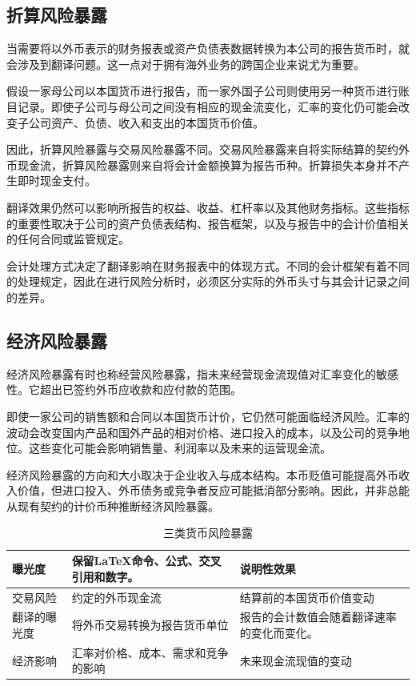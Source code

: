 \subsection{折算风险暴露}

当需要将以外币表示的财务报表或资产负债表数据转换为本公司的报告货币时，就会涉及到翻译问题。这一点对于拥有海外业务的跨国企业来说尤为重要。

假设一家母公司以本国货币进行报告，而一家外国子公司则使用另一种货币进行账目记录。即使子公司与母公司之间没有相应的现金流变化，汇率的变化仍可能会改变子公司资产、负债、收入和支出的本国货币价值。

因此，折算风险暴露与交易风险暴露不同。交易风险暴露来自将实际结算的契约外币现金流，折算风险暴露则来自将会计金额换算为报告币种。折算损失本身并不产生即时现金支付。

翻译效果仍然可以影响所报告的权益、收益、杠杆率以及其他财务指标。这些指标的重要性取决于公司的资产负债表结构、报告框架，以及与报告中的会计价值相关的任何合同或监管规定。

会计处理方式决定了翻译影响在财务报表中的体现方式。不同的会计框架有着不同的处理规定，因此在进行风险分析时，必须区分实际的外币头寸与其会计记录之间的差异。

\subsection{经济风险暴露}

经济风险暴露有时也称经营风险暴露，指未来经营现金流现值对汇率变化的敏感性。它超出已签约外币应收款和应付款的范围。

即使一家公司的销售额和合同以本国货币计价，它仍然可能面临经济风险。汇率的波动会改变国内产品和国外产品的相对价格、进口投入的成本，以及公司的竞争地位。这些变化可能会影响销售量、利润率以及未来的运营现金流。

经济风险暴露的方向和大小取决于企业收入与成本结构。本币贬值可能提高外币收入价值，但进口投入、外币债务或竞争者反应可能抵消部分影响。因此，并非总能从现有契约的计价币种推断经济风险暴露。


\begin{table}[htbp]
\centering
\caption{三类货币风险暴露}
\label{tab:ch10-currency-exposure-types}

\begin{tabularx}{\textwidth}{@{}p{3.1cm}X X@{}}
\toprule
\textbf{曝光度}
& \textbf{保留LaTeX命令、公式、交叉引用和数字。}
& \textbf{说明性效果} \\
\midrule

交易风险
& 约定的外币现金流
& 结算前的本国货币价值变动 \\

翻译的曝光度&将外币交易转换为报告货币单位&报告的会计数值会随着翻译速率的变化而变化。\\

经济影响
& 汇率对价格、成本、需求和竞争的影响
& 未来现金流现值的变动 \\

\bottomrule
\end{tabularx}
\end{table}

